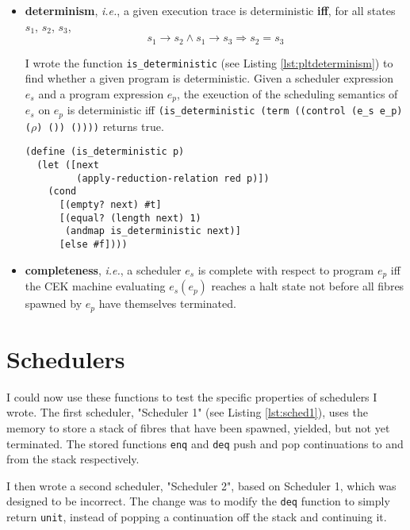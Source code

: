 \documentclass[12pt,a4paper,twoside,openright]{report}
\begin{document}
\begin{itemize}
\item \textbf{determinism}, \textit{i.e.}, a given execution trace is deterministic \textbf{iff}, for all states $s_1$, $s_2$, $s_3$, $$s_1 \longrightarrow s_2 \wedge s_1 \longrightarrow s_3 \Rightarrow s_2 = s_3$$

I wrote the function \texttt{is\_deterministic} (see Listing \ref{lst:pltdeterminism}) to find whether a given program is deterministic. Given a scheduler expression $e_s$ and a program expression $e_p$, the exeuction of the scheduling semantics of $e_s$ on $e_p$ is deterministic iff \texttt{(is\_deterministic (term ((control (e\_s e\_p) ($\rho$) ()) ())))} returns true.

\begin{minipage}{\linewidth} \begin{lstlisting}[caption=A function that determines whether a scheduler and program in \texttt{Alg} are deterministic,label={lst:pltdeterminism}]
(define (is_deterministic p)
  (let ([next
         (apply-reduction-relation red p)])
    (cond
      [(empty? next) #t]
      [(equal? (length next) 1)
       (andmap is_deterministic next)]
      [else #f])))
\end{lstlisting} \end{minipage}

\item \textbf{completeness}, \textit{i.e.}, a scheduler $e_s$ is complete with respect to program $e_p$ iff the CEK machine evaluating $e_s (e_p)$ reaches a halt state not before all fibres spawned by $e_p$ have themselves terminated.

\end{itemize}

\section{Schedulers}
I could now use these functions to test the specific properties of schedulers I wrote. The first scheduler, "Scheduler 1" (see Listing \ref{lst:sched1}), uses the memory to store a stack of fibres that have been spawned, yielded, but not yet terminated. The stored functions \texttt{enq} and \texttt{deq} push and pop continuations to and from the stack respectively.

I then wrote a second scheduler, "Scheduler 2", based on Scheduler 1, which was designed to be incorrect. The change was to modify the \texttt{deq} function to simply return \texttt{unit}, instead of popping a continuation off the stack and continuing it.
\end{document}
